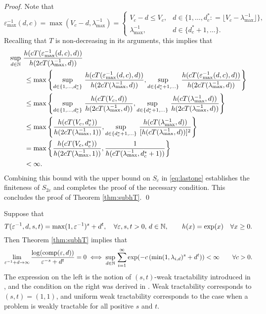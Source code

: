 \documentclass[sort&compress]{elsarticle}
\newcommand{\peter}[1]{\begingroup\color{purple}#1\endgroup}
\begin{document}
\begin{proof}
Note that
\[
\varepsilon^{-1}_{\max}(d,c) = \max(V_c - d,\lambda_{\max}^{-1})
= \begin{cases} V_c - d \le V_c, & d \in \{1, \ldots, d^*_c : = \lfloor V_c - \lambda_{\max}^{-1} \rfloor\}, \\
\lambda_{\max}^{-1}, & d \in \{d^*_c+1, \ldots\}.
\end{cases}
\]
Recalling that $T$ is non-decreasing in its arguments, this implies that
\begin{align*}
    \MoveEqLeft{\sup_{d\in\naturals} \,
		 \frac{ h(cT(\varepsilon^{-1}_{\max}(d,c),d))}{h(2cT(\lambda_{\max}^{-1},d))}}\\
  &\le \max \left \{
  \sup_{d \in \{1, \ldots, d^*_c\}} \,
		 \frac{ h(cT(\varepsilon^{-1}_{\max}(d,c),d))}{h(2cT(\lambda_{\max}^{-1},d))},
  \sup_{d\in \{d^*_c+1, \ldots \}} \,
		 \frac{ h(cT(\varepsilon^{-1}_{\max}(d,c),d))}{h(2cT(\lambda_{\max}^{-1},d))}
  \right \} \\
  & \le \max \left \{
  \sup_{d \in \{1, \ldots, d^*_c\}}  \,
		 \frac{ h(cT(V_c,d))}{h(2cT(\lambda_{\max}^{-1},d))}
  ,
  \sup_{d\in \{d^*_c+1, \ldots \}}  \,
		 \frac{ h(cT(\lambda_{\max}^{-1},d))}{h(2cT(\lambda_{\max}^{-1},d))}
  \right \}
  \\
  & \le \max \left \{
		 \frac{ h(cT(V_c,d^*_c))}{h(2cT(\lambda_{\max}^{-1},1))},
  \sup_{d\in \{d^*_c+1, \ldots \}}  \,
		 \frac{ h(cT(\lambda_{\max}^{-1},d))}{[h(cT(\lambda_{\max}^{-1},d))]^2}
  \right \} \\
  & = \max \left \{
		 \frac{ h(cT(V_c,d^*_c))}{h(2cT(\lambda_{\max}^{-1},1))},
		 \frac{1}{h(cT(\lambda_{\max}^{-1},d_c^*+1))}
  \right \} \\
  & < \infty.
\end{align*}
Combining this bound with the upper bound on $S_c$ in \eqref{eq:lastone} establishes the finiteness of $S_{2c}$ and completes the proof of the necessary condition.
This concludes the proof of Theorem \ref{thm:subhT}.  \qed
\end{proof}




\begin{example}
	Suppose that
	\[
	T(\varepsilon^{-1},d,s,t) = \max(1,\varepsilon^{-1})^s + d^t, \quad \forall \varepsilon,s,t > 0, \, d \in \mathbb{N}, \qquad h(x) = \exp(x) \quad \forall x \ge 0.
	\]
	Then Theorem \ref{thm:subhT} implies that
	\[\lim_{\varepsilon^{-1}+d\rightarrow \infty} \frac{\log( \operatorname{comp}(\varepsilon,d))}{\varepsilon^{-s}+d^t} = 0
	\iff
	 \sup_{d\in\mathbb{N}}  \, \sum_{i=1}^\infty \exp(-c\, (\min(1,\lambda_{i,d})^{s} + d^t )) <\infty \qquad \forall c > 0.
	\]
	The expression on the left is the notion of $(s,t)$-weak tractability \peter{introduced in \cite{SW15}}, and the condition on the right was derived in \peter{\cite[Theorem 3.1]{WW17}}.  Weak tractability corresponds to $(s,t)=(1,1)$, and uniform weak tractability corresponds to the case when a problem is weakly tractable for all positive $s$ and $t$.
\end{example}
\end{document}
